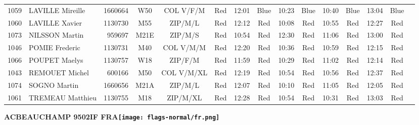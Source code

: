 \documentclass{report}
\begin{document}
\begin{longtable}{|c|l|r|c|c|*{5}{cc|}}
    1059 & LAVILLE Mireille & 1660664 & W50 & COL V/F/M & Red & 12:01 & Blue & 10:23 & Blue & 10:40 & Blue & 13:04 & Blue &  \\
    1060 & LAVILLE Xavier & 1130730 & M55 & ZIP/M/L & Red & 12:12 & Red & 10:08 & Red & 10:55 & Red & 12:27 & Red &  \\
    1073 & NILSSON Martin & 959697 & M21E & ZIP/M/S & Red & 10:54 & Red & 12:30 & Red & 11:06 & Red & 13:00 & Red &  \\
    1046 & POMIE Frederic & 1130731 & M40 & COL V/M/M & Red & 12:20 & Red & 10:36 & Red & 10:59 & Red & 12:15 & Red &  \\
    1066 & POUPET Maelys & 1130757 & W18 & ZIP/F/M & Red & 11:59 & Red & 10:29 & Red & 11:02 & Red & 12:14 & Red &  \\
    1043 & REMOUET Michel & 600166 & M50 & COL V/M/XL & Red & 12:19 & Red & 10:54 & Red & 10:56 & Red & 12:37 & Red &  \\
    1074 & SOGNO Martin & 1660656 & M21A & ZIP/M/L & Red & 12:07 & Red & 10:10 & Red & 11:05 & Red & 12:05 & Red &  \\
    1061 & TREMEAU Matthieu & 1130755 & M18 & ZIP/M/XL & Red & 12:28 & Red & 10:54 & Red & 10:31 & Red & 13:03 & Red &  \\
  \end{longtable}
\newpage
  \Huge \centering \bfseries ACBEAUCHAMP 9502IF FRA\normalfont \footnotesize \sffamily \hfill \texttt{[image: flags-normal/fr.png]} \newline 
\end{document}
